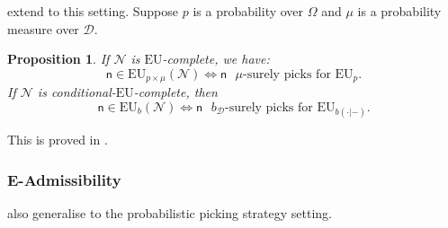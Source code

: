 \documentclass[a4paper,final]{article}
\newtheorem{proposition}[theorem]{Proposition}
\newcommand\EU{\mathrm{EU}}
\newcommand{\D}{\mathcal{D}}
\newcommand{\Decs}{\mathcal{D}}
\newcommand{\n}{\mathsf{n}}
\newcommand\Nu{\mathcal{N}}
\newcommand{\IB}{\mathbb{B}}
\renewcommand{\color}[1]{}
\newenvironment{colored}[1]{\leavevmode\color{#1}}{}
\newenvironment{CCM rewritten}
{\begingroup\color{blue}} %
{\endgroup}              %
\begin{document}
	
	



 extend to this setting.
Suppose $p$ is a probability over $\Omega$ and $\mu$ is a probability measure over $\D$.
\begin{proposition}\label{thm:eu-nu-nec-suff}
If $\Nu$ is $\EU$-complete, we have:
$$\n \in \EU_{p\times \mu}(\Nu) \Leftrightarrow \n \text{ $\mu$-surely picks for $\EU_p$.}$$
If $\Nu$ is conditional-$\EU$-complete, then
$$\n \in \EU_{b}(\Nu) \Leftrightarrow \n \text{ $b_\Decs$-surely picks for $\EU_{b(\cdot|-)}$.}$$
\end{proposition}
This is proved in .

\subsubsection{E-Admissibility}
 also generalise to the probabilistic picking strategy setting. 

\end{document}
